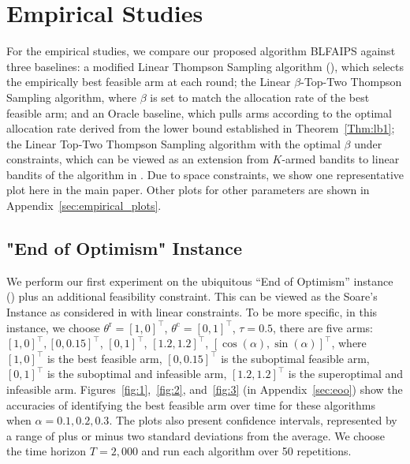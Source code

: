 \documentclass[accepted]{uai2025} %
\theoremstyle{plain}
\theoremstyle{definition}
\theoremstyle{remark}
\newcommand{\thetac}{\theta^{\mathrm{c}}}
\newcommand{\thetar}{\theta^{\mathrm{r}}}
\begin{document}
\vspace{-.1in}
\section{Empirical Studies}\vspace{-.1in}
For the empirical studies, we compare our proposed algorithm BLFAIPS against three baselines: a modified Linear Thompson Sampling algorithm (\cite{agrawal2013thompson}), which selects the empirically best feasible arm at each round; the Linear $\beta$-Top-Two Thompson Sampling algorithm, where $\beta$ is set to match the allocation rate of the best feasible arm; and an Oracle baseline, which pulls arms according to the optimal allocation rate derived from the lower bound established in Theorem~\ref{Thm:lb1}; the Linear Top-Two Thompson Sampling algorithm with the optimal $\beta$ under constraints, which can be viewed as an extension from $K$-armed bandits to linear bandits of the algorithm in \citet{yang2022minimax}. Due to space constraints, we show one representative plot here in the main paper. Other plots for other parameters are shown in Appendix~\ref{sec:empirical_plots}.

\vspace{-.1in}
\subsection{"End of Optimism" Instance}\vspace{-.1in}
We perform our first  experiment on the ubiquitous ``End of Optimism'' instance  (\cite{lattimore2017end}) plus an additional feasibility constraint. This can be viewed as the Soare's Instance as considered in \cite{li2024optimal} with linear constraints. To be more specific, in this instance, we choose $\thetar=[1, 0]^\top$, $\thetac=[0, 1]^\top$, $\tau=0.5$, there are  five arms: $[1, 0]^\top, [0, 0.15]^\top$, $[0, 1]^\top$, $[1.2, 1.2]^\top$, $ [\cos(\alpha), \sin(\alpha)]^\top$, where $[1, 0]^\top$ is the best feasible arm, $[0, 0.15]^\top$ is the suboptimal feasible arm, $[0, 1]^\top$ is the suboptimal and infeasible arm, $[1.2, 1.2]^\top$ is the superoptimal and infeasible arm. Figures~\ref{fig:1},~\ref{fig:2}, and~\ref{fig:3} (in Appendix~\ref{sec:eoo}) show the  accuracies  of identifying the best feasible arm over time for these algorithms when $\alpha=0.1, 0.2, 0.3$. The plots also present confidence intervals, represented by a range of plus or minus two standard deviations  from the average. We choose the time horizon $T=2,000$ and run each algorithm over 50 repetitions.
\end{document}
